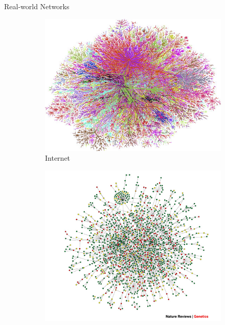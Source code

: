 \documentclass{beamer}
\begin{document}



\begin{frame}{Real-world Networks}
	\begin{figure}[!h]
		\centering
		\begin{subfigure}[b]{0.3\textwidth}
			\includegraphics[width=\textwidth]{images/Steve-Jurvetson.jpg}
			\caption{Internet}
		\end{subfigure}\qquad
		\begin{subfigure}[b]{0.3\textwidth}
			\includegraphics[width= \textwidth]{images/yeastprotein-protein-interactions.jpeg}

\end{subfigure}
\end{figure}
\end{frame}
\end{document}
